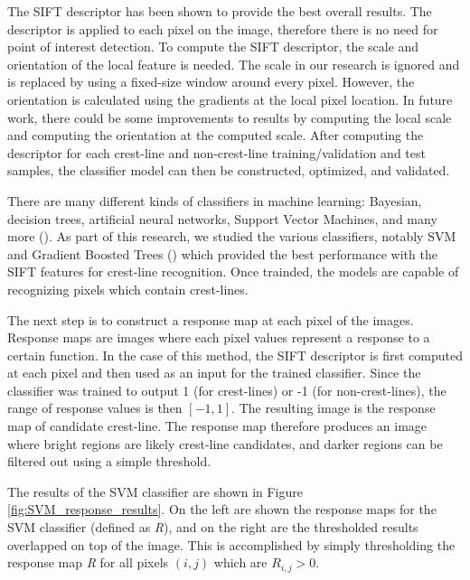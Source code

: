 The SIFT descriptor has been shown to provide the best overall results. The descriptor is applied to each pixel on the image, therefore there is no need for point of interest detection. To compute the SIFT descriptor, the scale and orientation of the local feature is needed. The scale in our research is ignored and is replaced by using a fixed-size window around every pixel. However, the orientation is calculated using the gradients at the local pixel location. In future work, there could be some improvements to results by computing the local scale and computing the orientation at the computed scale. After computing the descriptor for each crest-line and non-crest-line training/validation and test samples, the classifier model can then be constructed, optimized, and validated.

There are many different kinds of classifiers in machine learning: Bayesian, decision trees, artificial neural networks, Support Vector Machines, and many more (\cite{book_artificial_intelligence_modern_approach,2003_tackling_poor_assumptions_naive_bayes,1987_simplifying_decision_trees,1943_logical_calculus_ideas_immanent_nervous_activity,book_organization_of_behavior,1975_beyond_regression_prediction_analysis,1995_support_vector_networks,1995_support_vector_clustering}). As part of this research, we studied the various classifiers, notably SVM and Gradient Boosted Trees (\cite{1999_gradient_boosting_machine,1999_stochastic_gradient_boosting}) which provided the best performance with the SIFT features for crest-line recognition. Once trainded, the models are capable of recognizing pixels which contain crest-lines. 

The next step is to construct a response map at each pixel of the images. Response maps are images where each pixel values represent a response to a certain function. In the case of this method, the SIFT descriptor is first computed at each pixel and then used as an input for the trained classifier. Since the classifier was trained to output 1 (for crest-lines) or -1 (for non-crest-lines), the range of response values is then $[-1, 1]$. The resulting image is the response map of candidate crest-line. The response map therefore produces an image where bright regions are likely crest-line candidates, and darker regions can be filtered out using a simple threshold. 

The results of the SVM classifier are shown in Figure \ref{fig:SVM_response_results}. On the left are shown the response maps for the SVM classifier (defined as \emph{R}), and on the right are the thresholded results overlapped on top of the image. This is accomplished by simply thresholding the response map \emph{R} for all pixels $(i,j)$ which are $R_{i,j} > 0$. 

